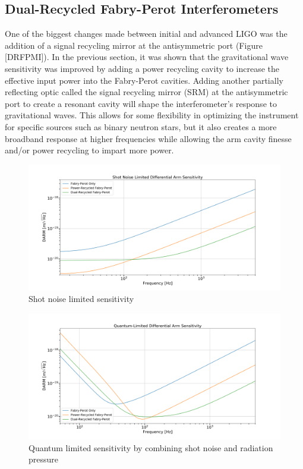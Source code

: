 		\subsection{Dual-Recycled Fabry-Perot Interferometers}\label{DRMI}
		
		One of the biggest changes made between initial and advanced LIGO was the addition of a signal recycling mirror at the antisymmetric port (Figure [DRFPMI]). In the previous section, it was shown that the gravitational wave sensitivity was improved by adding a power recycling cavity to increase the effective input power into the Fabry-Perot cavities.  Adding another partially reflecting optic called the signal recycling mirror (SRM) at the antisymmetric port to create a resonant cavity will shape the interferometer's response to gravitational waves.  This allows for some flexibility in optimizing the instrument for specific sources such as binary neutron stars, but it also creates a more broadband response at higher frequencies while allowing the arm cavity finesse and/or power recycling to impart more power.
		
		\begin{figure}[ht]
			\centering
			\includegraphics[width=1.0 \textwidth]{../Figures/SN_Lim_Sense.png}
			\caption{Shot noise limited sensitivity}
			\label{fig:SN_sense}
		\end{figure}
		
		\begin{figure}[ht]
			\centering
			\includegraphics[width=1.0 \textwidth]{../Figures/QM_Limited_Sense.png}
			\caption{Quantum limited sensitivity by combining shot noise and radiation pressure}
			\label{fig:DRMICH_sense}
		\end{figure}
		
